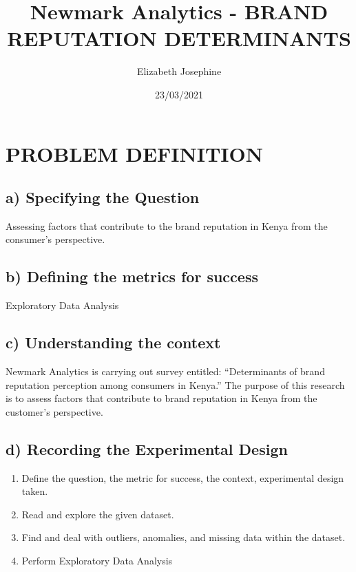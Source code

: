 \documentclass[
]{article}
\title{Newmark Analytics - BRAND REPUTATION DETERMINANTS}
\author{Elizabeth Josephine}
\date{23/03/2021}
\providecommand{\tightlist}{%
  \setlength{\itemsep}{0pt}\setlength{\parskip}{0pt}}
\begin{document}
\maketitle

\hypertarget{problem-definition}{%
\section{PROBLEM DEFINITION}\label{problem-definition}}

\hypertarget{a-specifying-the-question}{%
\subsection{\texorpdfstring{\textbf{a) Specifying the
Question}}{a) Specifying the Question}}\label{a-specifying-the-question}}

Assessing factors that contribute to the brand reputation in Kenya from
the consumer's perspective.

\hypertarget{b-defining-the-metrics-for-success}{%
\subsection{\texorpdfstring{\textbf{b) Defining the metrics for
success}}{b) Defining the metrics for success}}\label{b-defining-the-metrics-for-success}}

Exploratory Data Analysis

\hypertarget{c-understanding-the-context}{%
\subsection{\texorpdfstring{\textbf{c) Understanding the
context}}{c) Understanding the context}}\label{c-understanding-the-context}}

Newmark Analytics is carrying out survey entitled: ``Determinants of
brand reputation perception among consumers in Kenya.'' The purpose of
this research is to assess factors that contribute to brand reputation
in Kenya from the customer's perspective.

\hypertarget{d-recording-the-experimental-design}{%
\subsection{\texorpdfstring{\textbf{d) Recording the Experimental
Design}}{d) Recording the Experimental Design}}\label{d-recording-the-experimental-design}}

\begin{enumerate}
\def\labelenumi{\arabic{enumi}.}
\tightlist
\item
  Define the question, the metric for success, the context, experimental
  design taken.
\item
  Read and explore the given dataset.
\item
  Find and deal with outliers, anomalies, and missing data within the
  dataset.
\item
  Perform Exploratory Data Analysis
\end{enumerate}
\end{document}
